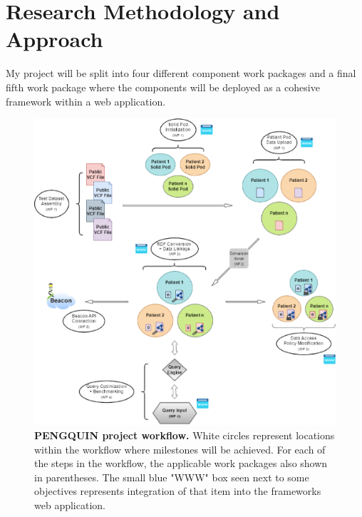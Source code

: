 \documentclass[runningheads]{llncs}
\begin{document}
\section{Research Methodology and Approach}

My project will be split into four different component work packages and a final fifth work package where the components will be deployed as a cohesive framework within a web application. 

\begin{figure}
\includegraphics[width=\textwidth]{fig1.eps}
\caption{\textbf{PENGQUIN project workflow.}
White circles represent locations within the workflow where milestones will be achieved. 
For each of the steps in the workflow, the applicable work packages also shown in parentheses. 
The small blue "WWW" box seen next to some objectives represents integration of that item into the framework\textquotesingle s web application.
} \label{fig1}
\end{figure}
\end{document}
